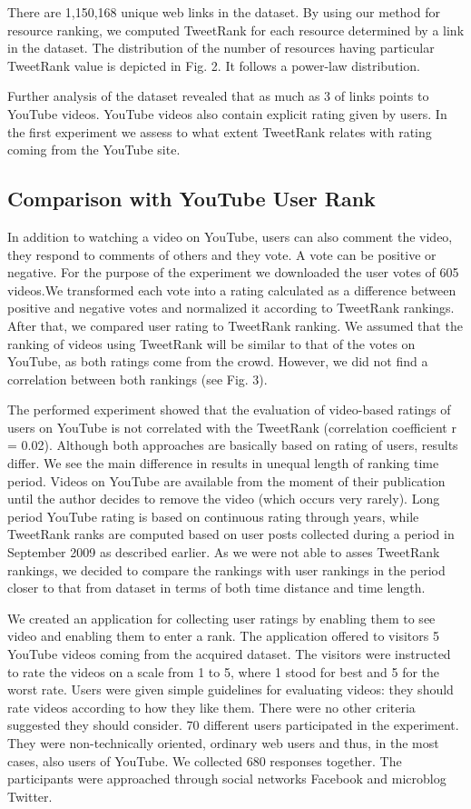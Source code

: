 \documentclass[]{article}
\begin{document}
There are 1,150,168 unique web links in the dataset. By using our method for
resource ranking, we computed TweetRank for each resource determined by a link in the dataset. The distribution of the number of resources having particular
TweetRank value is depicted in Fig. 2. It follows a power-law distribution.

Further analysis of the dataset revealed that as much as 3  of links points
to YouTube videos. YouTube videos also contain explicit rating given by users.
In the first experiment we assess to what extent TweetRank relates with rating
coming from the YouTube site.

\subsection {Comparison with YouTube User Rank}

In addition to watching a video on YouTube, users can also comment the video,
they respond to comments of others and they vote. A vote can be positive or
negative. For the purpose of the experiment we downloaded the user votes of 605
videos.We transformed each vote into a rating calculated as a difference between
positive and negative votes and normalized it according to TweetRank rankings.
After that, we compared user rating to TweetRank ranking. We assumed that
the ranking of videos using TweetRank will be similar to that of the votes on
YouTube, as both ratings come from the crowd. However, we did not find a
correlation between both rankings (see Fig. 3).

The performed experiment showed that the evaluation of video-based ratings
of users on YouTube is not correlated with the TweetRank (correlation coefficient
r = 0.02). Although both approaches are basically based on rating of users,
results differ. We see the main difference in results in unequal length of ranking
time period. Videos on YouTube are available from the moment of their publication
until the author decides to remove the video (which occurs very rarely).
Long period YouTube rating is based on continuous rating through years, while
TweetRank ranks are computed based on user posts collected during a period
in September 2009 as described earlier. As we were not able to asses TweetRank
rankings, we decided to compare the rankings with user rankings in the period
closer to that from dataset in terms of both time distance and time length.

We created an application for collecting user ratings by enabling them to see
video and enabling them to enter a rank. The application offered to visitors 5 YouTube videos coming from the acquired dataset. The visitors were instructed
to rate the videos on a scale from 1 to 5, where 1 stood for best and 5 for
the worst rate. Users were given simple guidelines for evaluating videos: they
should rate videos according to how they like them. There were no other criteria
suggested they should consider. 70 different users participated in the experiment.
They were non-technically oriented, ordinary web users and thus, in the
most cases, also users of YouTube. We collected 680 responses together. The
participants were approached through social networks Facebook and microblog
Twitter.
\end{document}
